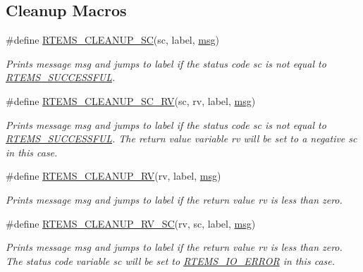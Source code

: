 \subsection*{Cleanup Macros}
\begin{DoxyCompactItemize}
\item 
\#define \mbox{\hyperlink{group__rtems__status__checks_ga7a4513d93b0e6baa53e29df854fb5507}{R\+T\+E\+M\+S\+\_\+\+C\+L\+E\+A\+N\+U\+P\+\_\+\+SC}}(sc,  label,  \mbox{\hyperlink{structmsg}{msg}})
\begin{DoxyCompactList}\small\item\em Prints message {\itshape msg} and jumps to {\itshape label} if the status code {\itshape sc} is not equal to \mbox{\hyperlink{group__ClassicStatus_gga545d41846817eaba6143d52ee4d9e9fea8a23e2d94778f09399da984d73562536}{R\+T\+E\+M\+S\+\_\+\+S\+U\+C\+C\+E\+S\+S\+F\+UL}}. \end{DoxyCompactList}\item 
\#define \mbox{\hyperlink{group__rtems__status__checks_ga76cb829de68a2f8221477cacc2d51b64}{R\+T\+E\+M\+S\+\_\+\+C\+L\+E\+A\+N\+U\+P\+\_\+\+S\+C\+\_\+\+RV}}(sc,  rv,  label,  \mbox{\hyperlink{structmsg}{msg}})
\begin{DoxyCompactList}\small\item\em Prints message {\itshape msg} and jumps to {\itshape label} if the status code {\itshape sc} is not equal to \mbox{\hyperlink{group__ClassicStatus_gga545d41846817eaba6143d52ee4d9e9fea8a23e2d94778f09399da984d73562536}{R\+T\+E\+M\+S\+\_\+\+S\+U\+C\+C\+E\+S\+S\+F\+UL}}. The return value variable {\itshape rv} will be set to a negative {\itshape sc} in this case. \end{DoxyCompactList}\item 
\#define \mbox{\hyperlink{group__rtems__status__checks_ga43b2b43b9c3728a8fb6128df2290ef8d}{R\+T\+E\+M\+S\+\_\+\+C\+L\+E\+A\+N\+U\+P\+\_\+\+RV}}(rv,  label,  \mbox{\hyperlink{structmsg}{msg}})
\begin{DoxyCompactList}\small\item\em Prints message {\itshape msg} and jumps to {\itshape label} if the return value {\itshape rv} is less than zero. \end{DoxyCompactList}\item 
\#define \mbox{\hyperlink{group__rtems__status__checks_ga6a8a7e598de3670c4804a2e191108531}{R\+T\+E\+M\+S\+\_\+\+C\+L\+E\+A\+N\+U\+P\+\_\+\+R\+V\+\_\+\+SC}}(rv,  sc,  label,  \mbox{\hyperlink{structmsg}{msg}})
\begin{DoxyCompactList}\small\item\em Prints message {\itshape msg} and jumps to {\itshape label} if the return value {\itshape rv} is less than zero. The status code variable {\itshape sc} will be set to \mbox{\hyperlink{group__ClassicStatus_gga545d41846817eaba6143d52ee4d9e9feaafb7268b75dfdd3f4518045e52525d45}{R\+T\+E\+M\+S\+\_\+\+I\+O\+\_\+\+E\+R\+R\+OR}} in this case. \end{DoxyCompactList}\item 

\end{DoxyCompactItemize}
